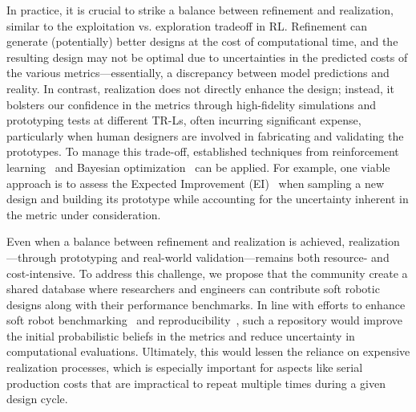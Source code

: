 In practice, it is crucial to strike a balance between refinement and realization, similar to the exploitation vs. exploration tradeoff in RL. Refinement can generate (potentially) better designs at the cost of computational time, and the resulting design may not be optimal due to uncertainties in the predicted costs of the various metrics—essentially, a discrepancy between model predictions and reality. In contrast, realization does not directly enhance the design; instead, it bolsters our confidence in the metrics through high-fidelity simulations and prototyping tests at different TR-Ls, often incurring significant expense, particularly when human designers are involved in fabricating and validating the prototypes. To manage this trade-off, established techniques from reinforcement learning~\citep{sutton1998reinforcement} and Bayesian optimization~\citep{garnett2023bayesian} can be applied. For example, one viable approach is to assess the Expected Improvement (EI)~\citep{jones1998efficient} when sampling a new design and building its prototype while accounting for the uncertainty inherent in the metric under consideration.

Even when a balance between refinement and realization is achieved, realization—through prototyping and real-world validation—remains both resource- and cost-intensive. To address this challenge, we propose that the community create a shared database where researchers and engineers can contribute soft robotic designs along with their performance benchmarks. In line with efforts to enhance soft robot benchmarking~\citep{bhatia2021evolution, wang2023softzoo} and reproducibility~\citep{baines2024need}, such a repository would improve the initial probabilistic beliefs in the metrics and reduce uncertainty in computational evaluations. Ultimately, this would lessen the reliance on expensive realization processes, which is especially important for aspects like serial production costs that are impractical to repeat multiple times during a given design cycle.